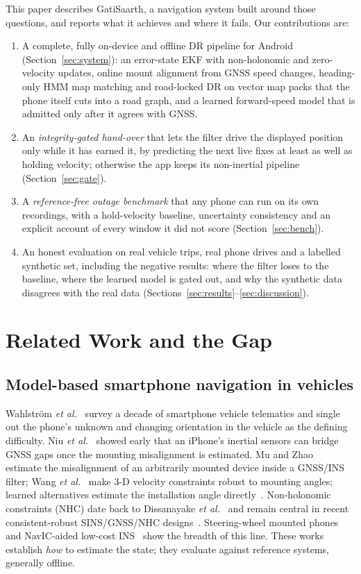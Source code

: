 \documentclass[conference]{IEEEtran}
\begin{document}
This paper describes GatiSaarth, a navigation system built around those
questions, and reports what it achieves and where it fails. Our contributions
are:
\begin{enumerate}
\item A complete, fully on-device and offline DR pipeline for Android
(Section~\ref{sec:system}): an error-state EKF with non-holonomic and
zero-velocity updates, online mount alignment from GNSS speed changes,
heading-only HMM map matching and road-locked DR on vector map packs that the
phone itself cuts into a road graph, and a learned forward-speed model that is
admitted only after it agrees with GNSS.
\item An \emph{integrity-gated hand-over} that lets the filter drive the
displayed position only while it has earned it, by predicting the next live
fixes at least as well as holding velocity; otherwise the app keeps its
non-inertial pipeline (Section~\ref{sec:gate}).
\item A \emph{reference-free outage benchmark} that any phone can run on its
own recordings, with a hold-velocity baseline, uncertainty consistency and an
explicit account of every window it did not score (Section~\ref{sec:bench}).
\item An honest evaluation on real vehicle trips, real phone drives and a
labelled synthetic set, including the negative results: where the filter loses
to the baseline, where the learned model is gated out, and why the synthetic
data disagrees with the real data (Sections~\ref{sec:results}--\ref{sec:discussion}).
\end{enumerate}

\section{Related Work and the Gap}
\label{sec:related}

\subsection{Model-based smartphone navigation in vehicles}
Wahlstr{\"o}m \emph{et al.}~\cite{wahlstrom2017telematics} survey a decade of
smartphone vehicle telematics and single out the phone's unknown and changing
orientation in the vehicle as the defining difficulty. Niu
\emph{et al.}~\cite{niu2012iphone} showed early that an iPhone's inertial
sensors can bridge GNSS gaps once the mounting misalignment is estimated. Mu
and Zhao~\cite{mu2019arbitrary} estimate the misalignment of an arbitrarily
mounted device inside a GNSS/INS filter; Wang
\emph{et al.}~\cite{wang2025velocity} make 3-D velocity constraints robust to
mounting angles; learned alternatives estimate the installation angle
directly~\cite{wang2023installangle,freydin2024alignment}. Non-holonomic
constraints (NHC) date back to Dissanayake
\emph{et al.}~\cite{dissanayake2001nhc} and remain central in recent
consistent-robust SINS/GNSS/NHC designs~\cite{du2024nhc}. Steering-wheel
mounted phones~\cite{moussa2019steering} and NavIC-aided low-cost
INS~\cite{sirikonda2021navic,sirikonda2025navic} show the breadth of this line.
These works establish \emph{how} to estimate the state; they evaluate against
reference systems, generally offline.
\end{document}
